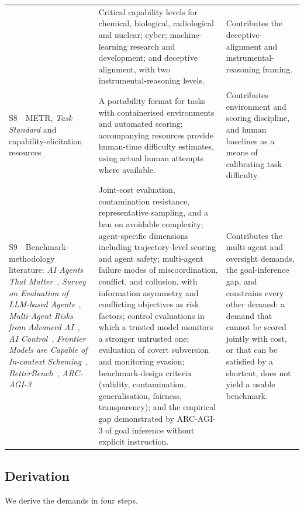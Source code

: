 \documentclass{article} %
\begin{document}
\begin{longtable}{@{}>{\raggedright\arraybackslash}p{}>{\raggedright\arraybackslash}p{}>{\raggedright\arraybackslash}p{}@{}}
		& Critical capability levels for chemical, biological, radiological and nuclear; cyber; machine-learning research and development; and deceptive alignment, with two instrumental-reasoning levels.
		& Contributes the deceptive-alignment and instrumental-reasoning framing. \\
		S8~~METR, \emph{Task Standard} and capability-elicitation resources~\citep{metr-task-standard,metr-autonomy-resources}
		& A portability format for tasks with containerised environments and automated scoring; accompanying resources provide human-time difficulty estimates, using actual human attempts where available.
		& Contributes environment and scoring discipline, and human baselines as a means of calibrating task difficulty. \\
		S9~~Benchmark-methodology literature: \emph{AI Agents That Matter}~\citep{kapoor2024agentsmatter}, \emph{Survey on Evaluation of LLM-based Agents}~\citep{yehudai2025agentsurvey}, \emph{Multi-Agent Risks from Advanced AI}~\citep{hammond2025multiagent}, \emph{AI Control}~\citep{greenblatt2024aicontrol}, \emph{Frontier Models are Capable of In-context Scheming}~\citep{meinke2024scheming}, \emph{BetterBench}~\citep{reuel2024betterbench}, \emph{ARC-AGI-3}~\citep{arc-agi-3}
		& Joint-cost evaluation, contamination resistance, representative sampling, and a ban on avoidable complexity; agent-specific dimensions including trajectory-level scoring and agent safety; multi-agent failure modes of miscoordination, conflict, and collusion, with information asymmetry and conflicting objectives as risk factors; control evaluations in which a trusted model monitors a stronger untrusted one; evaluation of covert subversion and monitoring evasion; benchmark-design criteria (validity, contamination, generalisation, fairness, transparency); and the empirical gap demonstrated by ARC-AGI-3 of goal inference without explicit instruction.
		& Contributes the multi-agent and oversight demands, the goal-inference gap, and constrains every other demand: a demand that cannot be scored jointly with cost, or that can be satisfied by a shortcut, does not yield a usable benchmark. \\
	\end{longtable}
	\endgroup
	
	\subsection{Derivation}
	
	We derive the demands in four steps.
	
\end{document}
